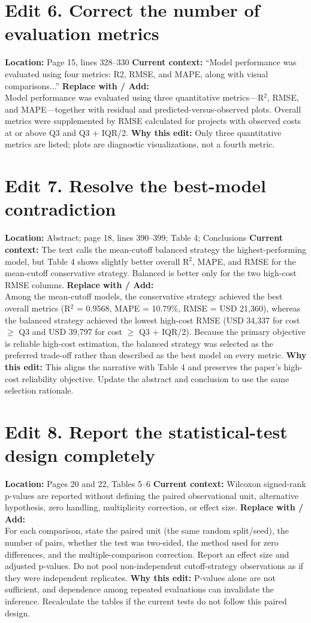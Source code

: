 \documentclass[11pt]{article}
\newcommand{\loc}[1]{\textbf{Location:} #1}
\newcommand{\current}[1]{\textbf{Current context:} #1}
\newcommand{\replacewith}[1]{\textbf{Replace with / Add:}\\{\color{blue}#1}}
\newcommand{\why}[1]{\textbf{Why this edit:} #1}
\begin{document}
\section*{Edit 6. Correct the number of evaluation metrics}
\loc{Page 15, lines 328--330}
\current{``Model performance was evaluated using four metrics: R2, RMSE, and MAPE, along with visual comparisons...''}
\replacewith{Model performance was evaluated using three quantitative metrics---R$^2$, RMSE, and MAPE---together with residual and predicted-versus-observed plots. Overall metrics were supplemented by RMSE calculated for projects with observed costs at or above Q3 and Q3 + IQR/2.}
\why{Only three quantitative metrics are listed; plots are diagnostic visualizations, not a fourth metric.}

\section*{Edit 7. Resolve the best-model contradiction}
\loc{Abstract; page 18, lines 390--399; Table 4; Conclusions}
\current{The text calls the mean-cutoff balanced strategy the highest-performing model, but Table 4 shows slightly better overall R$^2$, MAPE, and RMSE for the mean-cutoff conservative strategy. Balanced is better only for the two high-cost RMSE columns.}
\replacewith{Among the mean-cutoff models, the conservative strategy achieved the best overall metrics (R$^2$ = 0.9568, MAPE = 10.79\%, RMSE = USD 21,360), whereas the balanced strategy achieved the lowest high-cost RMSE (USD 34,337 for cost $\geq$ Q3 and USD 39,797 for cost $\geq$ Q3 + IQR/2). Because the primary objective is reliable high-cost estimation, the balanced strategy was selected as the preferred trade-off rather than described as the best model on every metric.}
\why{This aligns the narrative with Table 4 and preserves the paper's high-cost reliability objective. Update the abstract and conclusion to use the same selection rationale.}

\section*{Edit 8. Report the statistical-test design completely}
\loc{Pages 20 and 22, Tables 5--6}
\current{Wilcoxon signed-rank p-values are reported without defining the paired observational unit, alternative hypothesis, zero handling, multiplicity correction, or effect size.}
\replacewith{For each comparison, state the paired unit (the same random split/seed), the number of pairs, whether the test was two-sided, the method used for zero differences, and the multiple-comparison correction. Report an effect size and adjusted p-values. Do not pool non-independent cutoff-strategy observations as if they were independent replicates.}
\why{P-values alone are not sufficient, and dependence among repeated evaluations can invalidate the inference. Recalculate the tables if the current tests do not follow this paired design.}
\end{document}
